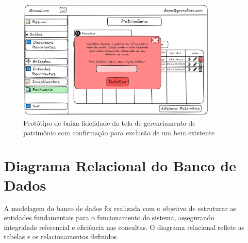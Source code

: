 \begin{figure}[H]
    \centering
    \includegraphics[width=0.9\textwidth]{imgs/09-patrimonio6.png}
    \caption{Protótipo de baixa fidelidade da tela de gerenciamento de patrimônio com confirmação para exclusão de um bem existente}
    \label{fig:prot_patrimonio6}
\end{figure}


\section{Diagrama Relacional do Banco de Dados}
A modelagem do banco de dados foi realizada com o objetivo de estruturar as entidades fundamentais para o funcionamento do sistema, assegurando integridade referencial e eficiência nas consultas. O diagrama relacional reflete as tabelas e os relacionamentos definidos.

